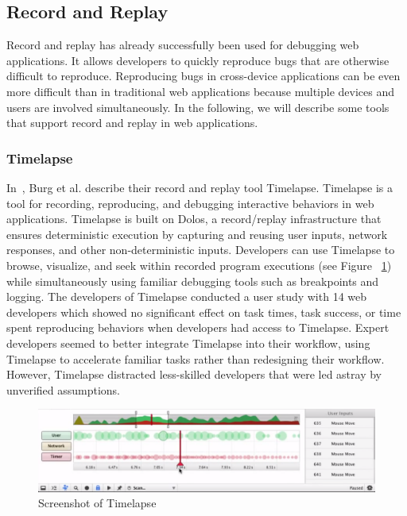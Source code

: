 \subsection{Record and Replay}

Record and replay has already successfully been used for debugging web applications. It allows developers to quickly reproduce bugs that are otherwise difficult to reproduce. Reproducing bugs in cross-device applications can be even more difficult than in traditional web applications because multiple devices and users are involved simultaneously. In the following, we will describe some tools that support record and replay in web applications.

\subsubsection{Timelapse}

In~\cite{timelapse2013}, Burg et al. describe their record and replay tool Timelapse. Timelapse is a tool for recording, reproducing, and debugging interactive behaviors in web applications. Timelapse is built on Dolos, a record/replay infrastructure that ensures deterministic execution by capturing and reusing user inputs, network responses, and other non-deterministic inputs. Developers can use Timelapse to browse, visualize, and seek within recorded program executions (see Figure ~\ref{fig:timelapse}) while simultaneously using familiar debugging tools such as breakpoints and logging. The developers of Timelapse conducted a user study with 14 web developers which showed no significant effect on task times, task success, or time spent reproducing behaviors when developers had access to Timelapse. Expert developers seemed to better integrate Timelapse into their workflow, using Timelapse to accelerate familiar tasks rather than redesigning their workflow. However, Timelapse distracted less-skilled developers that were led astray by unverified assumptions.

\begin{figure}[H]
  \centering
    \includegraphics[width=1.0\textwidth]{images/relatedwork/timelapse.png}
	\caption[Screenshot: Timelapse]{Screenshot of Timelapse}
	\label{fig:timelapse}
\end{figure}

